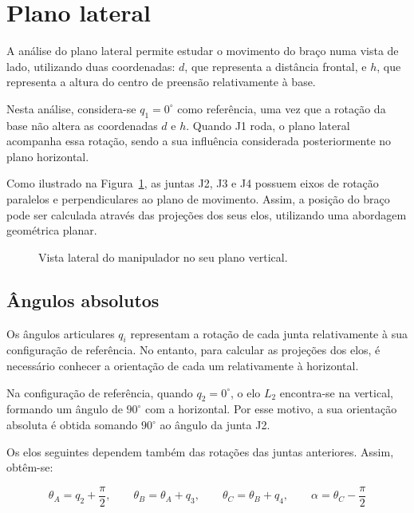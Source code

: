
\section{Plano lateral}
\label{sec:plano_lateral}

A análise do plano lateral permite estudar o movimento do braço numa vista de lado, utilizando duas coordenadas: $d$, que representa a distância frontal, e $h$, que representa a altura do centro de preensão relativamente à base.

Nesta análise, considera-se $q_1=0^\circ$ como referência, uma vez que a rotação da base não altera as coordenadas $d$ e $h$. Quando J1 roda, o plano lateral acompanha essa rotação, sendo a sua influência considerada posteriormente no plano horizontal.

Como ilustrado na Figura~\ref{fig:lateral}, as juntas J2, J3 e J4 possuem eixos de rotação paralelos e perpendiculares ao plano de movimento. Assim, a posição do braço pode ser calculada através das projeções dos seus elos, utilizando uma abordagem geométrica planar.

\begin{figure}[H]
    \centering
    \resizebox{0.6\textwidth}{!}{}
    \caption{Vista lateral do manipulador no seu plano vertical.}
    \label{fig:lateral}
\end{figure}

\subsection{Ângulos absolutos}

Os ângulos articulares $q_i$ representam a rotação de cada junta relativamente à sua configuração de referência. No entanto, para calcular as projeções dos elos, é necessário conhecer a orientação de cada um relativamente à horizontal.

Na configuração de referência, quando $q_2=0^\circ$, o elo $L_2$ encontra-se na vertical, formando um ângulo de $90^\circ$ com a horizontal. Por esse motivo, a sua orientação absoluta é obtida somando $90^\circ$ ao ângulo da junta J2.

Os elos seguintes dependem também das rotações das juntas anteriores. Assim, obtêm-se:

\begin{equation}
    \theta_A=q_2+\frac{\pi}{2}, \qquad
    \theta_B=\theta_A+q_3, \qquad
    \theta_C=\theta_B+q_4, \qquad
    \alpha=\theta_C-\frac{\pi}{2}
    \label{eq:angulos}
\end{equation}

